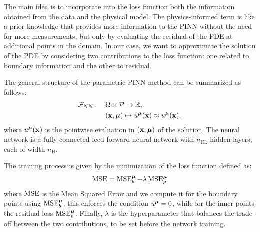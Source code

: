 \documentclass[
    conference,
    nofonttune,
    11pt
]{IEEEtran}
\begin{document}
            The main idea is to incorporate into the loss function both the information obtained from the data and the physical model. The physics-informed term is like a prior knowledge that provides more information to the PINN without the need for more measurements, but only by evaluating the residual of the PDE at additional points in the domain. In our case, we want to approximate the solution of the PDE by considering two contributions to the loss function: one related to boundary information and the other to residual. 
            
            The general structure of the parametric PINN method can be summarized as follows:
            \begin{equation}
                \label{eq:NN}
                \begin{aligned}
                    \mathcal{F}_{NN} \colon \quad & \Omega \times \mathcal{P} \to \mathbb{R}, \\
                    & (\mathbf x,\boldmu) \mapsto \bar{u}^\boldmu(\mathbf x) \approx u^\boldmu(\mathbf x).
                \end{aligned}
            \end{equation}
            where $ u^{\boldsymbol\mu}(\mathbf x)$ is the pointwise evaluation in $(\mathbf x,{\boldsymbol\mu})$ of the solution. 
            The neural network is a fully-connected feed-forward neural network with $n_{\mathrm{HL}}$ hidden layers, each of width $n_{\mathrm H}$.

            The training process is given by the minimization of the loss function defined as:
            \begin{equation}
                \operatorname{MSE}=\operatorname{MSE}^{\boldsymbol\mu}_b+\lambda \operatorname{MSE}^{\boldsymbol\mu}_p
            \end{equation}
            where $\operatorname{MSE}$ is the Mean Squared Error and we compute it for the boundary points using $\operatorname{MSE}^{\boldsymbol\mu}_b$, this enforces the condition $u^{\boldsymbol\mu}=0$, while for the inner points the residual loss $\operatorname{MSE}^{\boldsymbol\mu}_p$. Finally, $\lambda$ is the hyperparameter that balances the trade-off between the two contributions, to be set before the network training.
\end{document}
